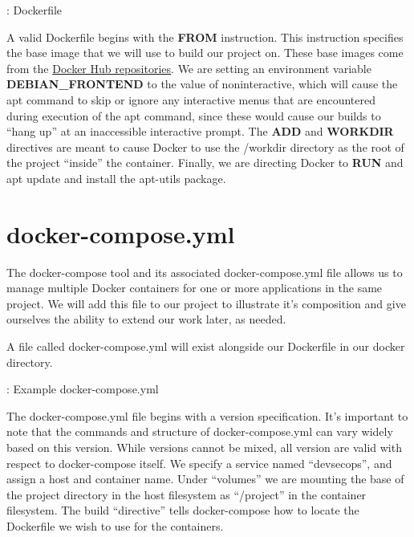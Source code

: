 \justify{}
\begin{mybox}{\thetcbcounter: Dockerfile}
  
  \label{mydockerfile}
\end{mybox}

\justify{}
A valid Dockerfile begins with the \textbf{FROM} instruction. This instruction specifies the base image that we
will use to build our project on. These base images come from the
\href{https://docs.docker.com/docker-hub/repos/}{Docker Hub repositories}. We are setting an environment variable
\textbf{DEBIAN\_FRONTEND} to the value of noninteractive, which will cause the apt command to skip or ignore any
interactive menus that are encountered during execution of the apt command, since these would cause
our builds to ``hang up'' at an inaccessible interactive prompt. The \textbf{ADD} and \textbf{WORKDIR} directives
are meant to cause Docker to use the /workdir directory as the root of the project ``inside'' the
container. Finally, we are directing Docker to \textbf{RUN} and apt update and install the apt-utils package.

\section{docker-compose.yml}
\justify{}
The docker-compose tool and its associated docker-compose.yml file allows us to manage multiple Docker containers for
one or more applications in the same project. We will add this file to our project to illustrate it's
composition and give ourselves the ability to extend our work later, as needed.

\justify{}
A file called docker-compose.yml will exist
alongside our Dockerfile in our docker directory.

\begin{mybox}{\thetcbcounter: Example docker-compose.yml}
  
\end{mybox}

\justify{}
The docker-compose.yml file begins with a version specification. It's important to note that the commands and structure
of docker-compose.yml can vary widely based on this version. While versions cannot be mixed, all version are valid with
respect to docker-compose itself. We specify a service named ``devsecops'', and assign a host and container name. Under
``volumes'' we are mounting the base of the project directory in the host
filesystem as ``/project'' in the container filesystem. The build
``directive'' tells docker-compose how to locate the Dockerfile we wish to use for the containers.

